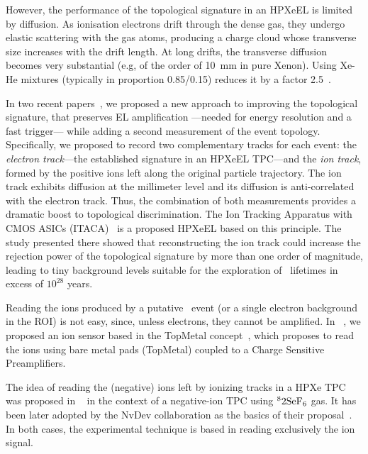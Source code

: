 \documentclass[pdflatex,iicol,sn-mathphys-num]{sn-jnl}
\begin{document}
However, the performance of the topological signature in an HPXeEL is limited by diffusion. As ionisation electrons drift through the dense gas, they undergo elastic scattering with the gas atoms, producing a charge cloud whose transverse size increases with the drift length. At long drifts, the transverse diffusion becomes very substantial (e.g, of the order of \SI{10}{mm} in pure Xenon). Using Xe-He mixtures (typically in proportion 0.85/0.15)  reduces it by a factor 2.5~\cite{Felkai:2017oeq, McDonald_2019, NEXT:2019oxh}.  

In two recent papers~\cite{Gomez-Cadenas:2025ect, itaca2026}, we proposed a new approach to improving the topological signature, that preserves EL amplification ---needed for energy resolution and a fast trigger--- while adding a second measurement of the event topology. Specifically, we proposed to record two complementary tracks for each event: the \emph{electron track}---the established signature in an HPXeEL TPC---and the \emph{ion track}, formed by the positive ions left along the original particle trajectory. The ion track exhibits diffusion at the millimeter level and its diffusion is anti-correlated with the electron track. Thus, the combination of both measurements provides a dramatic boost to topological discrimination.
The Ion Tracking Apparatus with CMOS ASICs (\textsc{ITACA})~\cite{itaca2026} is a proposed  HPXeEL based on this principle. The study presented there showed that reconstructing the ion track could increase the rejection power of the topological signature by more than one order of magnitude, leading to tiny background levels suitable for the exploration of \bbonu\ lifetimes in excess of $10^{28}$ years.

Reading the ions produced by a putative \bbonu\ event (or a single electron background in the ROI) is not easy, since, unless electrons, they cannot be amplified. In ~\cite{itaca2026}, we proposed an ion sensor based in the TopMetal concept~\cite{An2016TopmetalII, Gao2019TopmetalS, Yang2024TopmetalCSA, Liang2024TopmetalS}, which proposes to read the ions using bare metal pads (TopMetal) coupled to a Charge Sensitive Preamplifiers.

The idea of reading the (negative) ions left by ionizing tracks in a HPXe TPC was proposed in  ~\cite{Nygren_2018} in the context of a negative-ion TPC using ${}^82{\rm SeF_6}$ gas. It has been later adopted by the NvDev collaboration as the basics of their
proposal~\cite{NnDEx-100:2023alw}. In both cases, the experimental technique is based in reading exclusively the ion signal. 
\end{document}
